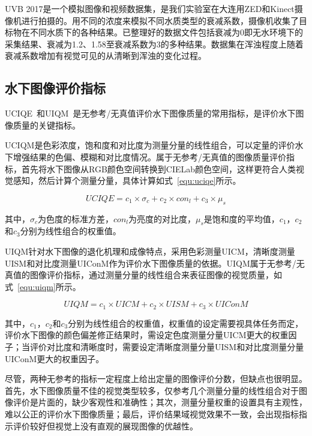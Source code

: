 UVB 2017是一个模拟图像和视频数据集，是我们实验室在大连用ZED和Kinect摄像机进行拍摄的。用不同的浓度来模拟不同水质类型的衰减系数，摄像机收集了目标物在不同水质下的各种结果。已整理好的数据文件包括衰减为0即无水环境下的采集结果、衰减为1.2、1.58至衰减系数为3的多种结果。数据集在浑浊程度上随着衰减系数增加有视觉可见的从清晰到浑浊的变化过程。

\subsection{水下图像评价指标}
UCIQE~\cite{yang2015underwater}和UIQM~\cite{panetta2015human}是无参考/无真值评价水下图像质量的常用指标，是评价水下图像质量的关键指标。

UCIQM是色彩浓度，饱和度和对比度为测量分量的线性组合，可以定量的评价水下增强结果的色偏、模糊和对比度情况。属于无参考/无真值的图像质量评价指标，首先将水下图像从RGB颜色空间转换到CIELab颜色空间，这样更符合人类视觉感知，然后计算个测量分量，具体计算如式~\ref{equ:uciqe}所示。

\begin{equation}
\label{equ:uciqe}
UCIQE = c_1 \times \sigma_c + c_2 \times con_l + c_3 \times \mu_s
\end{equation}

其中，$ \sigma_c$为色度的标准方差，$con_l$为亮度的对比度，$\mu_s$是饱和度的平均值，$c_1$，$c_2$和$c_3$分别为线性组合的权重值。

UIQM针对水下图像的退化机理和成像特点，采用色彩测量UICM，清晰度测量UISM和对比度测量UIConM作为评价水下图像质量的依据。UIQM属于无参考/无真值的图像评价指标，通过测量分量的线性组合来表征图像的视觉质量，如式~\ref{equ:uiqm}所示。

\begin{equation}
\label{equ:uiqm}
UIQM = c_1 \times UICM + c_2 \times UISM + c_3 \times UIConM
\end{equation}

其中，$c_1$，$c_2$和$c_3$分别为线性组合的权重值，权重值的设定需要视具体任务而定，评价水下图像的颜色偏差修正结果时，需设定色度测量分量UICM更大的权重因子；当评价对比度和清晰度时，需要设定清晰度测量分量UISM和对比度测量分量UIConM更大的权重因子。

尽管，两种无参考的指标一定程度上给出定量的图像评价分数，但缺点也很明显。首先，水下图像质量不佳的视觉类型较多，仅参考几个测量分量的线性组合对于图像评价是片面的，缺少客观性和准确性；其次，测量分量权重的设置具有主观性，难以公正的评价水下图像质量；最后，评价结果域视觉效果不一致，会出现指标指示评价较好但视觉上没有直观的展现图像的优越性。


